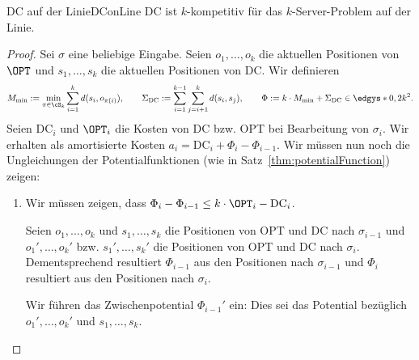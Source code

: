 \documentclass[language=ngerman,algolist]{TemplateLecture}
\begin{document}
\begin{thm}{DC auf der Linie}{DConLine}
    DC ist $k$-kompetitiv für das $k$-Server-Problem auf der Linie.
\end{thm}
\begin{proof}
    Sei $\sigma$ eine beliebige Eingabe. Seien $o_1, \ldots, o_k$ die aktuellen Positionen von $\OPT$ und $s_1, \ldots, s_k$ die aktuellen Positionen von DC. Wir definieren
    \begin{equation*}
        M_{\min} := \min_{\pi \in \cS_k} \sum_{i = 1}^k d(s_i, o_{\pi(i)}), \quad \quad \Sigma_{\text{DC}} := \sum_{i = 1}^{k-1} \sum_{j = i+1}^k d(s_i, s_j), \quad \quad \Phi := k \cdot M_{\min} + \Sigma_{\text{DC}} \in \edgys*{0,2k^2}.
    \end{equation*}
    Seien $\text{DC}_i$ und $\OPT_i$ die Kosten von DC bzw. OPT bei Bearbeitung von $\sigma_i$. Wir erhalten als amortisierte Kosten $a_i = \text{DC}_i + \Phi_i - \Phi_{i-1}$. Wir müssen nun noch die Ungleichungen der Potentialfunktionen (wie in Satz~\ref{thm:potentialFunction}) zeigen:
    \begin{enumerate}
        \item Wir müssen zeigen, dass $\Phi_i - \Phi_{i-1} \leq k \cdot \OPT_i - \text{DC}_i$.
        
        Seien $o_1, \ldots, o_k$ und $s_1, \ldots, s_k$ die Positionen von OPT und DC nach $\sigma_{i-1}$ und $o_1', \ldots, o_k'$ bzw. $s_1', \ldots, s_k'$ die Positionen von OPT und DC nach $\sigma_i$. Dementsprechend resultiert $\Phi_{i-1}$ aus den Positionen nach $\sigma_{i-1}$ und $\Phi_i$ resultiert aus den Positionen nach $\sigma_i$. 

        Wir führen das Zwischenpotential $\Phi_{i-1}'$ ein: Dies sei das Potential bezüglich $o_1', \ldots, o_k'$ und $s_1, \ldots, s_k$.


\end{enumerate}
\end{proof}
\end{document}
